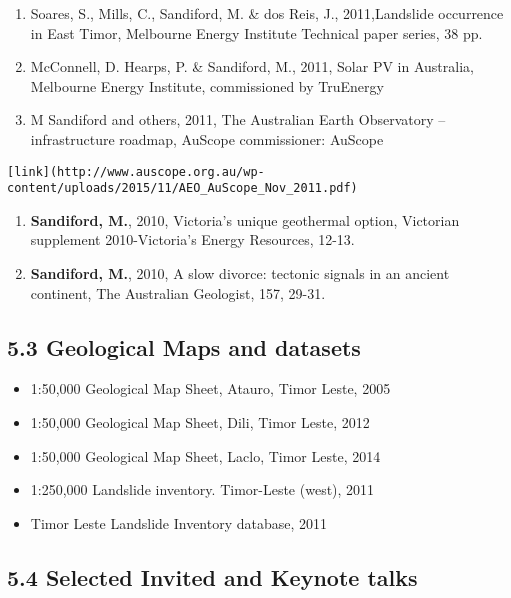 \documentclass[
]{article}
\providecommand{\tightlist}{%
  \setlength{\itemsep}{0pt}\setlength{\parskip}{0pt}}
\begin{document}
\begin{enumerate}
\def\labelenumi{\arabic{enumi}.}
\tightlist
\item
  Soares, S., Mills, C., Sandiford, M. \& dos Reis, J., 2011,Landslide
  occurrence in East Timor, Melbourne Energy Institute Technical paper
  series, 38 pp.
\item
  McConnell, D. Hearps, P. \& Sandiford, M., 2011, Solar PV in
  Australia, Melbourne Energy Institute, commissioned by TruEnergy
\item
  M Sandiford and others, 2011, The Australian Earth Observatory --
  infrastructure roadmap, AuScope commissioner: AuScope
\end{enumerate}

\begin{verbatim}
[link](http://www.auscope.org.au/wp-content/uploads/2015/11/AEO_AuScope_Nov_2011.pdf)
\end{verbatim}

\begin{enumerate}
\def\labelenumi{\arabic{enumi}.}
\tightlist
\item
  \textbf{Sandiford, M.}, 2010, Victoria's unique geothermal option,
  Victorian supplement 2010-Victoria's Energy Resources, 12-13.
\item
  \textbf{Sandiford, M.}, 2010, A slow divorce: tectonic signals in an
  ancient continent, The Australian Geologist, 157, 29-31.
\end{enumerate}

\hypertarget{geological-maps-and-datasets}{%
\subsection{5.3 Geological Maps and
datasets}\label{geological-maps-and-datasets}}

\begin{itemize}
\tightlist
\item
  1:50,000 Geological Map Sheet, Atauro, Timor Leste, 2005
\item
  1:50,000 Geological Map Sheet, Dili, Timor Leste, 2012
\item
  1:50,000 Geological Map Sheet, Laclo, Timor Leste, 2014
\item
  1:250,000 Landslide inventory. Timor-Leste (west), 2011
\item
  Timor Leste Landslide Inventory database, 2011
\end{itemize}

\hypertarget{selected-invited-and-keynote-talks}{%
\subsection{5.4 Selected Invited and Keynote
talks}\label{selected-invited-and-keynote-talks}}
\end{document}
